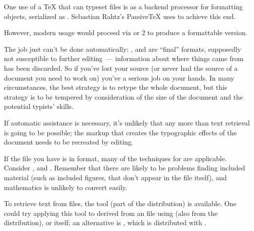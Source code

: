 One use of a \TeX{} that can typeset  files is as a backend
processor for  formatting objects, serialized as .
Sebastian Rahtz's Passive\TeX{} uses  to
achieve this end.

However, modern usage would proceed via  or 2 to
produce a formattable version.
\begin{ctanrefs}
\item[Context]
\item[xmltex]
\item[passivetex]
\end{ctanrefs}


The job just can't be done automatically: , \PS{} and
 are ``final'' formats, supposedly not susceptible to
further editing~--- information about where things came from has been
discarded.  So if you've lost your \AllTeX{} source (or never
had the source of a document you need to work on) you've a serious job
on your hands.  In many circumstances, the best strategy is to retype
the whole document, but this strategy is to be tempered by
consideration of the size of the document and the potential typists'
skills.

If automatic assistance is necessary, it's unlikely that any more than
text retrieval is going to be possible; the \AllTeX{} markup that
creates the typographic effects of the document needs to be recreated
by editing.

If the file you have is in  format, many of the techniques
for  are
applicable.  Consider ,  and
.  Remember that there are likely to be problems
finding included material (such as included \PS{} figures, that
don't appear in the  file itself), and mathematics is
unlikely to convert easily.

To retrieve text from \PS{} files, the
 tool (part of the
\href{http://www.ghostscript.com/}{}
distribution) is available.  One could try applying this tool to
\PS{} derived from an  file using  (also
from the \href{http://www.ghostscript.com/}{}
distribution), or 
 itself; an alternative is ,
which is distributed with .

